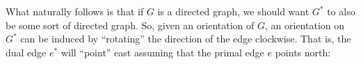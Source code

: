 \documentclass{amsart}
\theoremstyle{plain}
\theoremstyle{remark}
\theoremstyle{definition}
\begin{document}
What naturally follows is that if $G$ is a directed graph, we should want
$G^*$ to also be some sort of directed graph.
So, given an orientation of $G$, an orientation on $G^*$ can be induced by
``rotating'' the direction of the edge clockwise. That is, the dual edge $e^*$
will ``point'' east assuming that the primal edge $e$ points north:
\begin{figure}[h]
  \hspace{1cm}
\end{figure}


%
%
%
\end{document}
